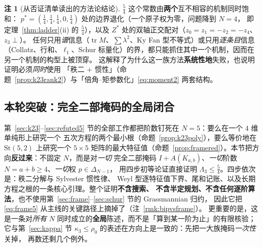 \documentclass[UTF8,11pt]{ctexart}
\theoremstyle{definition}
\newtheorem{remark}[theorem]{注}
\newcommand{\Lam}{\Lambda}
\newcommand{\tr}{\operatorname{tr}}
\begin{document}
\begin{remark}[从否证清单读出的方法论结论]\label{rmk:lesson5}
$\frac54$ 这个常数由\textbf{两个}互不相容的机制同时饱和：
$p^\ast=(\frac14,\frac14,\frac14,0,\frac14)$ 处的边界退化（一个原子权为零，问题降到 $N=4$，
即定理~\ref{thm:ladder}(ii) 的 $\frac54$），以及 $Z^\ast$ 处的双轴正交配对（$z_0=z_1=-z_2=-z_4$、$z_3\perp$）。
任何只用\emph{谱}信息（$\tr M$、$\sum\lambda^2$、Ky Fan 型不等式）或只用\emph{逐条目}信息
（Collatz、行和、$\ell_1$、Schur 标量化）的界，都只能抓住其中一个机制，因而在另一个机制的构型上被顶穿。
这解释了为什么这一族方法\textbf{系统性地}失败，也说明证明必须\emph{同时}使用
「秩二 $+$ 惯性」（命题~\ref{prop:k23rank2}）与「倍角--矩参数化」\eqref{eq:moment2} 两套结构。
\end{remark}

\subsection{本轮突破：完全二部掩码的全局闭合}\label{sec:bipglobal}

第~\ref{sec:k23}--\ref{sec:refuted5} 节的全部工作都把阶数钉死在 $N=5$：要么在一个 $4$ 维单纯形上研究一个
五次方程的两个最小根（命题~\ref{prop:k23poly}），要么等价地在 $\mathrm{St}(5,2)$ 上研究一个 $5\times5$
矩阵的最大特征值（命题~\ref{prop:framered}）。本节把方向\textbf{反过来}：不固定 $N$，而是对\emph{一切}
完全二部掩码 $I+A(K_{a,b})$、\emph{一切}阶数 $N=a+b\ge4$、\emph{一切}权 $p\in\Delta_{N-1}$，
用四步初等论证直接证明 $\Lam_3\le\frac54$。四步依次是：秩二分解与 Sylvester 惯性律、
Weyl 型逐特征值下界、尾和记账、以及长期方程之根的一条核心引理。整个证明\textbf{不含搜索、
不含半定规划、不含任何逐阶算法}，也不使用第~\ref{sec:frame}--\ref{sec:schur} 节的 Grassmannian 归约，
因此它把 \eqref{eq:frame5} 从主线的关键路径上摘掉了（注~\ref{rmk:bipvsframe}）。
更重要的是，这是一条对\emph{所有} $N$ 同时成立的\textbf{全局}陈述，而不是「算到某一阶为止」的有限核验；
它与第~\ref{sec:kappa} 节 $\kappa_3\le\rho_0$ 的表述在方向上是一致的：先把一大族掩码\emph{一次性}关掉，
再数还剩几个例外。
\end{document}

